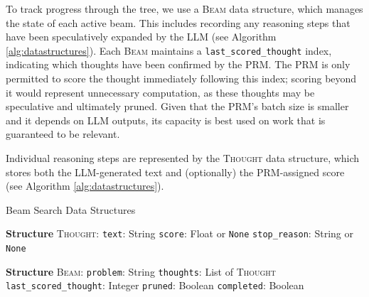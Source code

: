 \documentclass[11pt,twoside]{report}
\begin{document}
To track progress through the tree, we use a \textsc{Beam} data structure, which manages the state of each active beam. 
This includes recording any reasoning steps that have been speculatively expanded by the LLM (see Algorithm \ref{alg:datastructures}). 
Each \textsc{Beam} maintains a \texttt{last\_scored\_thought} index, indicating which thoughts have been confirmed by the PRM. 
The PRM is only permitted to score the thought immediately following this index; scoring beyond it would represent unnecessary computation, as these thoughts may be speculative and ultimately pruned. 
Given that the PRM’s batch size is smaller and it depends on LLM outputs, its capacity is best used on work that is guaranteed to be relevant.

Individual reasoning steps are represented by the \textsc{Thought} data structure, which stores both the LLM-generated text and (optionally) the PRM-assigned score (see Algorithm \ref{alg:datastructures}).

\begin{algorithm}[H]\label{alg:datastructures}
\caption{Beam Search Data Structures}
\begin{algorithmic}[1]
\State \textbf{Structure} \textsc{Thought}:
\State \hspace{0.5cm} \texttt{text}: String 
\State \hspace{0.5cm} \texttt{score}: Float or \texttt{None} 
\State \hspace{0.5cm} \texttt{stop\_reason}: String or \texttt{None} 

\Statex

\State \textbf{Structure} \textsc{Beam}:
\State \hspace{0.5cm} \texttt{problem}: String 
\State \hspace{0.5cm} \texttt{thoughts}: List of \textsc{Thought} 
\State \hspace{0.5cm} \texttt{last\_scored\_thought}: Integer 
\State \hspace{0.5cm} \texttt{pruned}: Boolean 
\State \hspace{0.5cm} \texttt{completed}: Boolean 
\end{algorithmic}
\end{algorithm}
\end{document}
